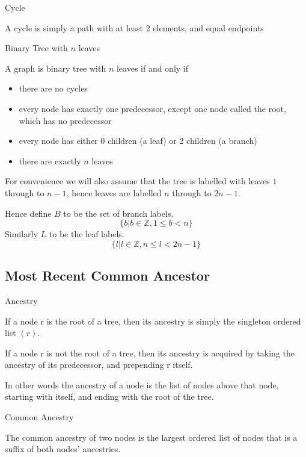 \documentclass{article}
\begin{document}
\begin{definition} Cycle

	A cycle is simply a path with at least 2 elements, and equal endpoints
\end{definition}

\begin{definition} Binary Tree with $n$ leaves

	A graph is binary tree with $n$ leaves if and only if
	\begin{itemize}
		\item there are no cycles
		\item every node has exactly one predecessor, except one node called
			the root, which has no predecessor
		\item every node has either 0 children (a leaf) or 2 children
			(a branch)
		\item there are exactly $n$ leaves
	\end{itemize}
\end{definition}

For convenience we will also assume that the tree is labelled with leaves $1$
through to $n-1$, hence leaves are labelled $n$ through to $2n-1$.

Hence define $B$ to be the set of branch labels.
\[\{b | b \in \mathds{Z}, 1 \leq b < n\}\]
Similarly $L$ to be the leaf labels.
\[\{l | l \in \mathds{Z}, n \leq l < 2n-1\}\]

\subsection{Most Recent Common Ancestor}

\begin{definition} Ancestry

	If a node r is the root of a tree, then its ancestry is simply the
	singleton ordered list $(r)$.

	If a node r is not the root of a tree, then its ancestry is acquired by
	taking the ancestry of its predecessor, and prepending r itself.

	In other words the ancestry of a node is the list of nodes above that node,
	starting with itself, and ending with the root of the tree.
\end{definition}

\begin{definition} Common Ancestry

	The common ancestry of two nodes is the largest ordered list of nodes that
	is a suffix of both nodes' ancestries.
\end{definition}
\end{document}
